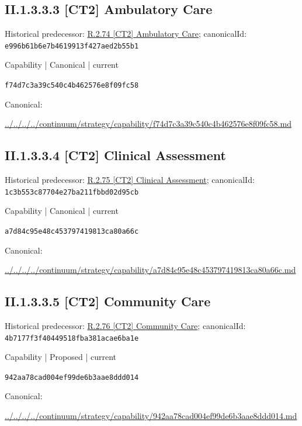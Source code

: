 \documentclass[10pt,a4paper]{article}
\begin{document}
\subsection*{II.1.3.3.3 [CT2] Ambulatory Care}
Historical predecessor: \hyperref[element-e996b61b6e7b4619913f427aed2b55b1]{R.2.74 [CT2] Ambulatory Care}; canonicalId: \texttt{e996b61b6e7b4619913f427aed2b55b1}\par
\label{element-f74d7c3a39c540c4b462576e8f09fc58}
{\small Capability | Canonical | current}\par
\texttt{f74d7c3a39c540c4b462576e8f09fc58}\par
Canonical: \par
{\footnotesize\url{../../../../continuum/strategy/capability/f74d7c3a39c540c4b462576e8f09fc58.md}}\par
\subsection*{II.1.3.3.4 [CT2] Clinical Assessment}
Historical predecessor: \hyperref[element-1c3b553c87704e27ba211fbbd02d95cb]{R.2.75 [CT2] Clinical Assessment}; canonicalId: \texttt{1c3b553c87704e27ba211fbbd02d95cb}\par
\label{element-a7d84c95e48c453797419813ca80a66c}
{\small Capability | Canonical | current}\par
\texttt{a7d84c95e48c453797419813ca80a66c}\par
Canonical: \par
{\footnotesize\url{../../../../continuum/strategy/capability/a7d84c95e48c453797419813ca80a66c.md}}\par
\subsection*{II.1.3.3.5 [CT2] Community Care}
Historical predecessor: \hyperref[element-4b7177f3f40449518fba381acae6ba1e]{R.2.76 [CT2] Community Care}; canonicalId: \texttt{4b7177f3f40449518fba381acae6ba1e}\par
\label{element-942aa78cad004ef99de6b3aae8ddd014}
{\small Capability | Proposed | current}\par
\texttt{942aa78cad004ef99de6b3aae8ddd014}\par
Canonical: \par
{\footnotesize\url{../../../../continuum/strategy/capability/942aa78cad004ef99de6b3aae8ddd014.md}}\par
\end{document}
